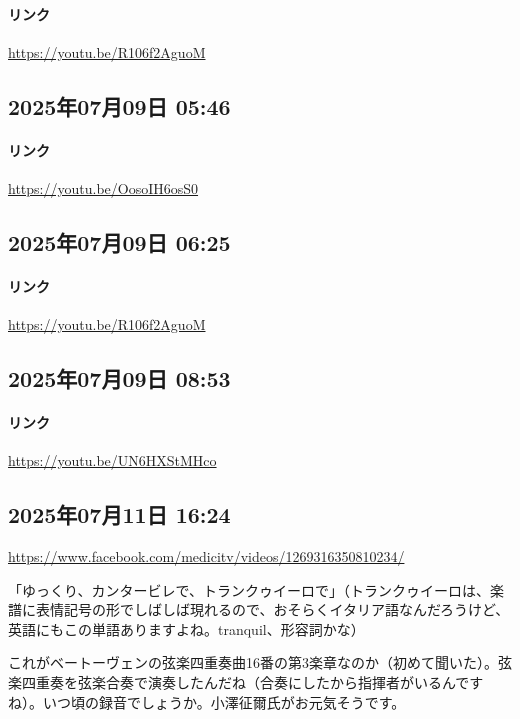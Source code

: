 \paragraph{リンク}
\url{https://youtu.be/R106f2AguoM}

\subsection*{2025年07月09日 05:46}

\paragraph{リンク}
\url{https://youtu.be/OosoIH6osS0}

\subsection*{2025年07月09日 06:25}

\paragraph{リンク}
\url{https://youtu.be/R106f2AguoM}

\subsection*{2025年07月09日 08:53}

\paragraph{リンク}
\url{https://youtu.be/UN6HXStMHco}

\subsection*{2025年07月11日 16:24}

\url{https://www.facebook.com/medicitv/videos/1269316350810234/}

「ゆっくり、カンタービレで、トランクゥイーロで」（トランクゥイーロは、楽譜に表情記号の形でしばしば現れるので、おそらくイタリア語なんだろうけど、英語にもこの単語ありますよね。tranquil、形容詞かな）

これがベートーヴェンの弦楽四重奏曲16番の第3楽章なのか（初めて聞いた）。弦楽四重奏を弦楽合奏で演奏したんだね（合奏にしたから指揮者がいるんですね）。いつ頃の録音でしょうか。小澤征爾氏がお元気そうです。

